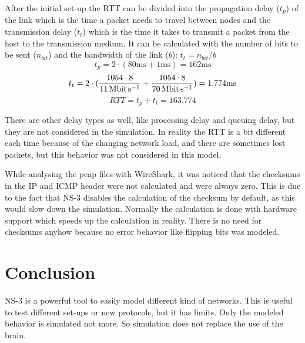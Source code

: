 \documentclass[parskip=full]{scrartcl}
\begin{document}
After the initial set-up the RTT can be divided into the propagation delay ($ t_p $) of the link which is the time a packet needs to travel between nodes and the transmission delay ($ t_t $) which is the time it takes to transmit a packet from the host to the transmission medium.  It can be calculated with the number of bits to be sent ($n_{bit}$) and the bandwidth of the link ($b$): $ t_t = n_{bit}/b$
\[t_p = 2\cdot(80 \si{\milli\second}+1 \si{\milli\second}) = 162 \si{\milli\second} \]
\[t_t = 2\cdot(\frac{1054\cdot8}{\SI{11}{\mega\bit\per\second}} +\frac{1054\cdot8}{\SI{70}{\mega\bit\per\second}}) = 1.774\si{\milli\second} \]
\[ RTT = t_p + t_t = 163.774 \]

There are other delay types as well, like processing delay and queuing delay, but they are not considered in the simulation. 
In reality the RTT is a bit different each time because of the changing network load, and there are sometimes lost packets,  but this behavior was not considered in this model.

While analysing the pcap files with WireShark, it was noticed that the checksums in the IP and ICMP header were not calculated and were always zero. 
This is due to the fact that NS-3 disables the calculation of the checksum by default, as this would slow down the simulation.
Normally the calculation is done with hardware support which speeds up the calculation in reality. 
There is no need for checksums anyhow because no error behavior like flipping bits was modeled.



\section{Conclusion}
NS-3 is a powerful tool to easily model different kind of networks. This is useful to test different set-ups or new protocols, but it has limits.
Only the modeled behavior is simulated not more. 
So simulation does not replace the use of the brain.



\printbibliography
\end{document}

